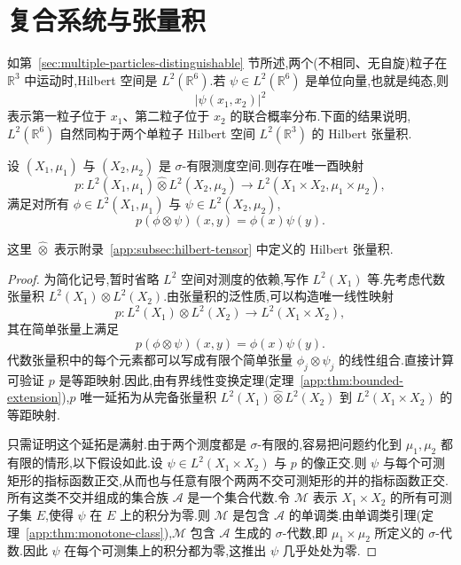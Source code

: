 \section{复合系统与张量积}
\label{sec:composite-systems-tensor}

如第~\ref{sec:multiple-particles-distinguishable} 节所述,两个(不相同、无自旋)粒子在 $\mathbb R^3$ 中运动时,Hilbert 空间是 $L^2(\mathbb R^6)$.若 $\psi\in L^2(\mathbb R^6)$ 是单位向量,也就是纯态,则
\[
 |\psi(x_1,x_2)|^2
\]
表示第一粒子位于 $x_1$、第二粒子位于 $x_2$ 的联合概率分布.下面的结果说明,$L^2(\mathbb R^6)$ 自然同构于两个单粒子 Hilbert 空间 $L^2(\mathbb R^3)$ 的 Hilbert 张量积.

\begin{proposition}\label{prop:l2-product-decomposition}
设 $(X_1,\mu_1)$ 与 $(X_2,\mu_2)$ 是 $\sigma$-有限测度空间.则存在唯一酉映射
\[
 p:L^2(X_1,\mu_1)\widehat\otimes L^2(X_2,\mu_2)
 \longrightarrow L^2(X_1\times X_2,\mu_1\times\mu_2),
\]
满足对所有 $\phi\in L^2(X_1,\mu_1)$ 与 $\psi\in L^2(X_2,\mu_2)$,
\[
 p(\phi\otimes\psi)(x,y)=\phi(x)\psi(y).
\]
\end{proposition}

这里 $\widehat\otimes$ 表示附录~\ref{app:subsec:hilbert-tensor} 中定义的 Hilbert 张量积.

\begin{proof}
为简化记号,暂时省略 $L^2$ 空间对测度的依赖,写作 $L^2(X_1)$ 等.先考虑代数张量积 $L^2(X_1)\otimes L^2(X_2)$.由张量积的泛性质,可以构造唯一线性映射
\[
 p:L^2(X_1)\otimes L^2(X_2)\longrightarrow L^2(X_1\times X_2),
\]
其在简单张量上满足
\[
 p(\phi\otimes\psi)(x,y)=\phi(x)\psi(y).
\]
代数张量积中的每个元素都可以写成有限个简单张量 $\phi_j\otimes\psi_j$ 的线性组合.直接计算可验证 $p$ 是等距映射.因此,由有界线性变换定理(定理~\ref{app:thm:bounded-extension}),$p$ 唯一延拓为从完备张量积 $L^2(X_1)\widehat\otimes L^2(X_2)$ 到 $L^2(X_1\times X_2)$ 的等距映射.

只需证明这个延拓是满射.由于两个测度都是 $\sigma$-有限的,容易把问题约化到 $\mu_1,\mu_2$ 都有限的情形,以下假设如此.设 $\psi\in L^2(X_1\times X_2)$ 与 $p$ 的像正交.则 $\psi$ 与每个可测矩形的指标函数正交,从而也与任意有限个两两不交可测矩形的并的指标函数正交.所有这类不交并组成的集合族 $\mathcal A$ 是一个集合代数.令 $\mathcal M$ 表示 $X_1\times X_2$ 的所有可测子集 $E$,使得 $\psi$ 在 $E$ 上的积分为零.则 $\mathcal M$ 是包含 $\mathcal A$ 的单调类.由单调类引理(定理~\ref{app:thm:monotone-class}),$\mathcal M$ 包含 $\mathcal A$ 生成的 $\sigma$-代数,即 $\mu_1\times\mu_2$ 所定义的 $\sigma$-代数.因此 $\psi$ 在每个可测集上的积分都为零,这推出 $\psi$ 几乎处处为零.
\end{proof}

